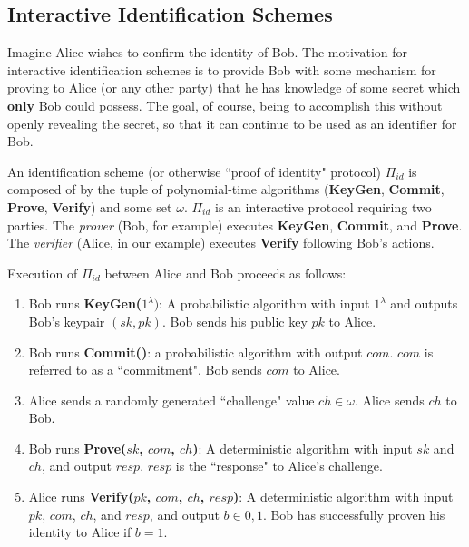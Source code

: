 \subsection{Interactive Identification Schemes}

Imagine Alice wishes to confirm the identity of Bob. The motivation for interactive identification schemes is to provide Bob with some mechanism for proving to Alice (or any other party) that he has knowledge of some secret which \textbf{only} Bob could possess. The goal, of course, being to accomplish this without openly revealing the secret, so that it can continue to be used as an identifier for Bob.

An identification scheme (or otherwise ``proof of identity" protocol) $\Pi_{id}$ is composed of by the tuple of polynomial-time algorithms (\textbf{KeyGen}, \textbf{Commit}, \textbf{Prove}, \textbf{Verify}) and some set $\omega$. $\Pi_{id}$ is an interactive protocol requiring two parties. The \emph{prover} (Bob, for example) executes \textbf{KeyGen}, \textbf{Commit}, and \textbf{Prove}. The \emph{verifier} (Alice, in our example) executes \textbf{Verify} following Bob's actions.

Execution of $\Pi_{id}$ between Alice and Bob proceeds as follows:
\begin{enumerate}[label=(\roman*)]
\item Bob runs \textbf{KeyGen($1^\lambda)$}: A probabilistic algorithm with input $1^\lambda$ and outputs Bob's keypair $(sk,pk)$. Bob sends his public key $pk$ to Alice.
\item Bob runs \textbf{Commit()}: a probabilistic algorithm with output $com$. $com$ is referred to as a ``commitment". Bob sends $com$ to Alice.
\item Alice sends a randomly generated ``challenge" value $ch \in \omega$. Alice sends $ch$ to Bob.
\item Bob runs \textbf{Prove($sk$, $com$, $ch$)}: A deterministic algorithm with input $sk$ and $ch$, and output $resp$. $resp$ is the ``response" to Alice's challenge.
\item Alice runs \textbf{Verify($pk$, $com$, $ch$, $resp$)}: A deterministic algorithm with input $pk$, $com$, $ch$, and $resp$, and output $b \in {0,1}$. Bob has successfully proven his identity to Alice if $b = 1$.
\end{enumerate}

